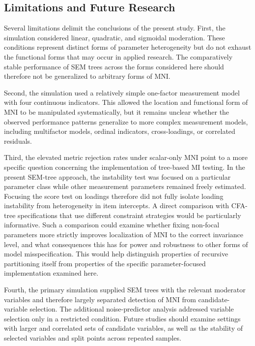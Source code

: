 \documentclass[
  man,
  floatsintext]{apa7}
\begin{document}
\subsection{Limitations and Future
Research}\label{limitations-and-future-research}

Several limitations delimit the conclusions of the present study. First,
the simulation considered linear, quadratic, and sigmoidal moderation.
These conditions represent distinct forms of parameter heterogeneity but
do not exhaust the functional forms that may occur in applied research.
The comparatively stable performance of SEM trees across the forms
considered here should therefore not be generalized to arbitrary forms
of MNI.

Second, the simulation used a relatively simple one-factor measurement
model with four continuous indicators. This allowed the location and
functional form of MNI to be manipulated systematically, but it remains
unclear whether the observed performance patterns generalize to more
complex measurement models, including multifactor models, ordinal
indicators, cross-loadings, or correlated residuals.

Third, the elevated metric rejection rates under scalar-only MNI point
to a more specific question concerning the implementation of tree-based
MI testing. In the present SEM-tree approach, the instability test was
focused on a particular parameter class while other measurement
parameters remained freely estimated. Focusing the score test on
loadings therefore did not fully isolate loading instability from
heterogeneity in item intercepts. A direct comparison with CFA-tree
specifications that use different constraint strategies would be
particularly informative. Such a comparison could examine whether fixing
non-focal parameters more strictly improves localization of MNI to the
correct invariance level, and what consequences this has for power and
robustness to other forms of model misspecification. This would help
distinguish properties of recursive partitioning itself from properties
of the specific parameter-focused implementation examined here.

Fourth, the primary simulation supplied SEM trees with the relevant
moderator variables and therefore largely separated detection of MNI
from candidate-variable selection. The additional noise-predictor
analysis addressed variable selection only in a restricted condition.
Future studies should examine settings with larger and correlated sets
of candidate variables, as well as the stability of selected variables
and split points across repeated samples.
\end{document}
